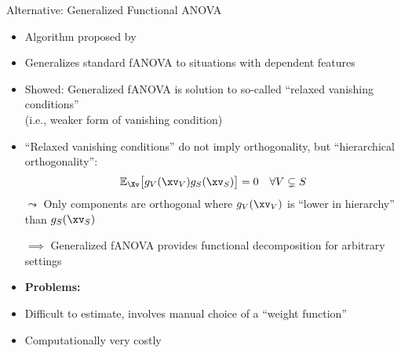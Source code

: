 \documentclass[11pt,compress,t,notes=noshow, aspectratio=169, xcolor=table]{beamer}
\begin{document}
\begin{frame}{Alternative: Generalized Functional ANOVA}

\begin{itemize}
    \item Algorithm proposed by 
    \item Generalizes standard fANOVA to situations with dependent features
    \item Showed: Generalized fANOVA is solution to so-called ``relaxed vanishing conditions'' \\
    (i.e., weaker form of vanishing condition) \\
    \item ``Relaxed vanishing conditions'' do not imply orthogonality, but ``hierarchical orthogonality'':
    $$
    \mathbb{E}_{\Xv} \bigl[ g_{V}(\xv_V) g_{S}(\xv_S) \bigr] = 0 \quad \forall V \subsetneq S
    $$
    $\leadsto$ Only components are orthogonal where $g_{V}(\xv_V)$ is ``lower in hierarchy'' than $g_{S}(\xv_S)$
    \item[$\implies$] Generalized fANOVA provides functional decomposition for arbitrary settings
    \item \textbf{Problems:}
    \item Difficult to estimate, involves manual choice of a ``weight function''
    \item Computationally very costly
    
\end{itemize}



    
\end{frame}

\end{document}
